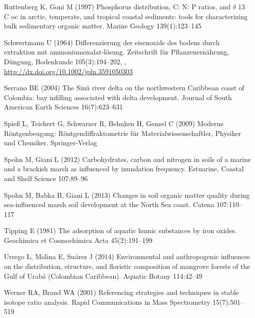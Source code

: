 \begin{thebibliography}{29}
Ruttenberg K, Goni M (1997) {Phosphorus distribution, C: N: P ratios, and
  $\delta$ 13 C oc in arctic, temperate, and tropical coastal sediments: tools
  for characterizing bulk sedimentary organic matter}. Marine Geology
  139(1):123--145

Schwertmann U (1964) Differenzierung der eisenoxide des bodens durch extraktion
  mit ammoniumoxalat-l{\"o}sung. Zeitschrift f{\"u}r Pflanzenern{\"a}hrung,
  D{\"u}ngung, Bodenkunde 105(3):194--202, ,
  \urlprefix\url{http://dx.doi.org/10.1002/jpln.3591050303}

Serrano BE (2004) {The Sin{\'u} river delta on the northwestern Caribbean coast
  of Colombia: bay infilling associated with delta development}. Journal of
  South American Earth Sciences 16(7):623--631

Spie{\ss} L, Teichert G, Schwarzer R, Behnken H, Genzel C (2009) {Moderne
  R{\"o}ntgenbeugung: R{\"o}ntgendiffraktometrie f{\"u}r
  Materialwissenschaftler, Physiker und Chemiker}. Springer-Verlag

Spohn M, Giani L (2012) {Carbohydrates, carbon and nitrogen in soils of a
  marine and a brackish marsh as influenced by inundation frequency}.
  Estuarine, Coastal and Shelf Science 107:89--96

Spohn M, Babka B, Giani L (2013) {Changes in soil organic matter quality during
  sea-influenced marsh soil development at the North Sea coast}. Catena
  107:110--117

Tipping E (1981) {The adsorption of aquatic humic substances by iron oxides}.
  {Geochimica et Cosmochimica Acta} 45(2):191--199

Urrego L, Molina E, Su{\'a}rez J (2014) {Environmental and anthropogenic
  influences on the distribution, structure, and floristic composition of
  mangrove forests of the Gulf of Urab{\'a} (Colombian Caribbean)}. {Aquatic
  Botany} 114:42--49

Werner RA, Brand WA (2001) {Referencing strategies and techniques in stable
  isotope ratio analysis}. Rapid Communications in Mass Spectrometry
  15(7):501--519

\end{thebibliography}
\DIFaddbegin 


